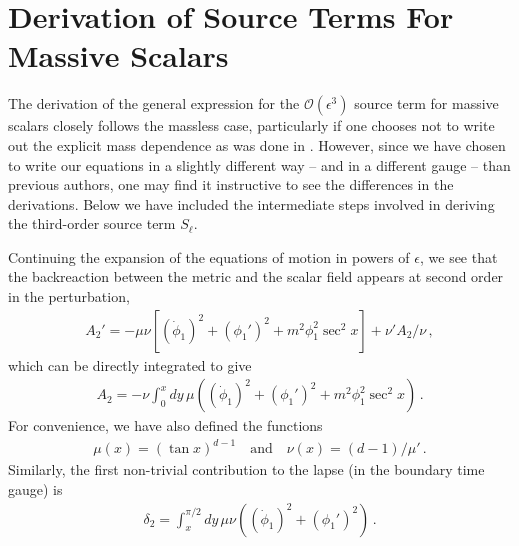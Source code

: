 \documentclass[letterpaper,11pt]{article}
\newcommand{\mc}{\mathcal}
\begin{document}
\appendix
\section{Derivation of Source Terms For Massive Scalars}
\label{app: source term derivation}

The derivation of the general expression for the $\mc{O}(\epsilon^3)$ source term for massive scalars closely follows the massless case, particularly if one chooses not to write out the explicit mass dependence as was done in \cite{1810.04753}. However, since we have chosen to write our equations in a slightly different way -- and in a different gauge -- than previous authors, one may find it instructive to see the differences in the derivations. Below we have included the intermediate steps involved in deriving the third-order source term $S_\ell$.

Continuing the expansion of the equations of motion in powers of $\epsilon$, we see that the backreaction between the metric and the scalar field appears at second order in the perturbation,
\begin{align}
A_2' = - \mu \nu \left[ (\dot \phi_1 )^2 + (\phi_1')^2 + m^2 \phi_1^2 \sec^2 x \right] + \nu' A_2 / \nu \, ,
\end{align}
which can be directly integrated to give
\begin{align}
A_2 = -\nu \int^x_0 dy \, \mu \left( (\dot \phi_1 )^2 + (\phi_1')^2 + m^2 \phi_1^2 \sec^2 x \right) \, .
\end{align}
For convenience, we have also defined the functions
\begin{align}
\mu (x) = \left( \tan x \right)^{d-1} \quad \text{and} \quad \nu(x) = (d-1) / \mu ' \, .
\end{align}
Similarly, the first non-trivial contribution to the lapse (in the boundary time gauge) is
\begin{align}
\delta_2 = \int^{\pi/2}_x dy \, \mu \nu \left(  (\dot \phi_1 )^2 + (\phi_1')^2 \right) \, .
\end{align}
\end{document}
